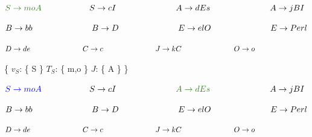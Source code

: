 \newpage

$ \textcolor{OliveGreen}{ S \rightarrow moA } \hspace{2cm} \textcolor{black}{ S \rightarrow cI } \hspace{2.5cm} \textcolor{black}{ A \rightarrow  dEs } \hspace{2.5cm} \textcolor{black}{ A \rightarrow  jBI }$ \newline

$ \textcolor{black}{ B \rightarrow bb } \hspace{2.5cm} \textcolor{black}{ B \rightarrow D } \hspace{2.5cm} \textcolor{black}{ E \rightarrow  elO } \hspace{2.5cm} \textcolor{black}{ E \rightarrow  Perl} $ \newline

$ \textcolor{black}{ D \rightarrow de } \hspace{2.5cm} \textcolor{black}{ C \rightarrow c} \hspace{2.5cm} \textcolor{black}{ J \rightarrow  kC } \hspace{2.5cm} \textcolor{black}{ O \rightarrow o } \hspace{2.5cm} $ \newline

\{ $ v_{S} $: \{ S \} \hspace{0.9cm} $ T_{S} $: \{ m,o \} \hspace{0.9cm} $ J $: \{ A \} \} \newline \newline

$ \textcolor{blue}{ S \rightarrow moA } \hspace{2cm} \textcolor{black}{ S \rightarrow cI } \hspace{2.5cm} \textcolor{OliveGreen}{ A \rightarrow  dEs } \hspace{2.5cm} \textcolor{black}{ A \rightarrow  jBI }$ \newline

$ \textcolor{black}{ B \rightarrow bb } \hspace{2.5cm} \textcolor{black}{ B \rightarrow D } \hspace{2.5cm} \textcolor{black}{ E \rightarrow  elO } \hspace{2.5cm} \textcolor{black}{ E \rightarrow  Perl} $ \newline

$ \textcolor{black}{ D \rightarrow de } \hspace{2.5cm} \textcolor{black}{ C \rightarrow c} \hspace{2.5cm} \textcolor{black}{ J \rightarrow  kC } \hspace{2.5cm} \textcolor{black}{ O \rightarrow o } \hspace{2.5cm} $ \newline 

